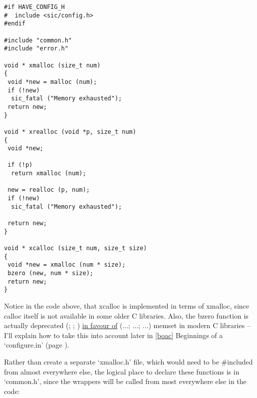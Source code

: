 \begin{Verbatim}[frame=single]
#if HAVE_CONFIG_H
#  include <sic/config.h>
#endif

#include "common.h"
#include "error.h"

void * xmalloc (size_t num)
{
 void *new = malloc (num);
 if (!new)
  sic_fatal ("Memory exhausted");
 return new;
}

void * xrealloc (void *p, size_t num)
{
 void *new;

 if (!p)
  return xmalloc (num);

 new = realloc (p, num);
 if (!new)
  sic_fatal ("Memory exhausted");

 return new;
}

void * xcalloc (size_t num, size_t size)
{
 void *new = xmalloc (num * size);
 bzero (new, num * size);
 return new;
}
\end{Verbatim}

Notice in the code above, that xcalloc is implemented in terms of xmalloc,
since calloc itself is not available in some older C libraries. Also, the 
bzero function is actually deprecated ({\McQ{}}; {\MaQ{}}; {\MjQ{}}) 
\underline{in favour of} ({\MjQ{}}...; {\MbQ{}}...; {\MbQ{}}...) memset in modern C 
libraries -- I'll explain how to take this into account later in 
\ref{boac} Beginnings of a `configure.in' (page \pageref{boac}). 


Rather than create a separate `xmalloc.h' file, which would need to 
be \#included from almost everywhere else, the logical place to declare 
these functions is in `common.h', since the wrappers will be called 
from most everywhere else in the code: 


